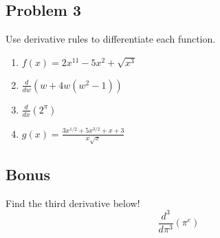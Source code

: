 \documentclass[10pt]{book}
\theoremstyle{definition}
\begin{document}
\subsection*{Problem 3} Use derivative rules to differentiate each function.
\begin{enumerate}[label=(\alph*)]
    \item $\displaystyle f(x)=2x^{11}-5x^2+\sqrt{x^3}$\vspace{3cm}
    \item $\displaystyle\frac{d}{dw}(w+4w(w^2-1))$\vspace{3cm}
    \item $\displaystyle \frac{d}{dx}(2^\pi)$\vspace{3cm}
    \item $\displaystyle g(x)=\frac{3x^{1/2}+5x^{3/2}+x+3}{x\sqrt{x}}$\vspace{4cm}
\end{enumerate}
\subsection*{Bonus} Find the third derivative below!
\[
\frac{d^3}{d\pi^3} (\pi^e)
\]
\end{document}
